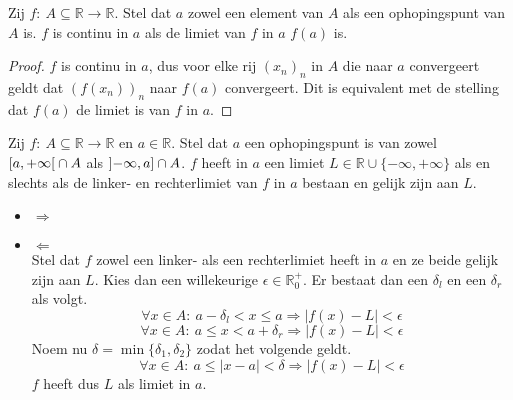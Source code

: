 \documentclass[main.tex]{subfiles}
\begin{document}
\begin{pr}
  \label{pr:functie-continu-asa-limiet-is-beeld}
  Zij $f:\ A \subseteq \mathbb{R} \rightarrow \mathbb{R}$.
  Stel dat $a$ zowel een element van $A$ als een ophopingspunt van $A$ is.
  $f$ is continu in $a$ als de limiet van $f$ in $a$ $f(a)$ is.

  \begin{proof}
    $f$ is continu in $a$, dus voor elke rij $(x_{n})_{n}$ in $A$ die naar $a$ convergeert geldt dat $(f(x_{n}))_{n}$ naar $f(a)$ convergeert.
    Dit is equivalent met de stelling dat $f(a)$ de limiet is van $f$ in $a$.
  \end{proof}
\end{pr}

\begin{pr}
  Zij $f:\ A \subseteq \mathbb{R} \rightarrow \mathbb{R}$ en $a\in \mathbb{R}$.
  Stel dat $a$ een ophopingspunt is van zowel $\interval[open right]{a}{+\infty} \cap A$ als $\interval[open left]{-\infty}{a} \cap A$.
  $f$ heeft in $a$ een limiet $L\in \mathbb{R}\cup \{ -\infty,+\infty\}$ als en slechts als de linker- en rechterlimiet van $f$ in $a$ bestaan en gelijk zijn aan $L$.

  \begin{itemize}
  \item $\Rightarrow$\\
  \item $\Leftarrow$\\
    Stel dat $f$ zowel een linker- als een rechterlimiet heeft in $a$ en ze beide gelijk zijn aan $L$.
    Kies dan een willekeurige $\epsilon\in\mathbb{R}_{0}^{+}$.
    Er bestaat dan een $\delta_{l}$ en een $\delta_{r}$ als volgt.
    \[ \forall x\in A:\ a-\delta_{l}<x\le a \Rightarrow |f(x)-L|<\epsilon \]
    \[ \forall x\in A:\ a\le x < a+\delta_{r} \Rightarrow |f(x)-L|<\epsilon \]
    Noem nu $\delta = \min\{\delta_{1},\delta_{2}\}$ zodat het volgende geldt.
    \[ \forall x\in A:\ a\le |x-a|<\delta \Rightarrow |f(x)-L|<\epsilon \]
    $f$ heeft dus $L$ als limiet in $a$.
  \end{itemize}
\end{pr}
\end{document}
